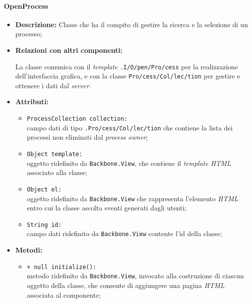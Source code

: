 \paragraph{OpenProcess}
\label{openProcess}
\begin{flushleft}
\begin{itemize}
\item \textbf{Descrizione:} Classe che ha il compito di gestire la ricerca e la selezione di un processo;
\item \textbf{Relazioni con altri componenti:}
\begin{sloppypar}
La classe comunica con il \textit{template} \texttt{\viewAdmin{}.I\fshyp{}O\fshyp{}pen\fshyp{}Pro\fshyp{}cess} per la realizzazione dell'interfaccia grafica, e con la classe \texttt{\collection{}Pro\fshyp{}cess\fshyp{}Col\fshyp{}lec\fshyp{}tion} per gestire e ottenere i dati dal \textit{server}.
\end{sloppypar}
\item \textbf{Attributi:}
\begin{sloppypar}
\begin{itemize}
\item \texttt{ProcessCollection collection:}\\ campo dati di tipo \texttt{\collection{}.Pro\fshyp{}cess\fshyp{}Col\fshyp{}lec\fshyp{}tion} che contiene la lista dei processi non eliminati dal \textit{process owner};
\item \texttt{Object template:}\\ oggetto ridefinito da \texttt{Backbone.View}, che contiene il \textit{template HTML} associato alla classe;
\item \texttt{Object el:}\\ oggetto ridefinito da \texttt{Backbone.View} che rappresenta l'elemento \textit{HTML} entro cui la classe ascolta eventi generati dagli utenti;
\item \texttt{String id:}\\ campo dati ridefinito da \texttt{Backbone.View} contente l'id della classe;
\end{itemize}
\end{sloppypar}
\item \textbf{Metodi:}
\begin{sloppypar}
\begin{itemize}
\item \texttt{+ null initialize():}\\ metodo ridefinito da \texttt{Backbone.View}, invocato alla costruzione di ciascun oggetto della classe, che consente di aggiungere una pagina \textit{HTML} associata al componente;

\end{itemize}
\end{sloppypar}
\end{itemize}
\end{flushleft}
